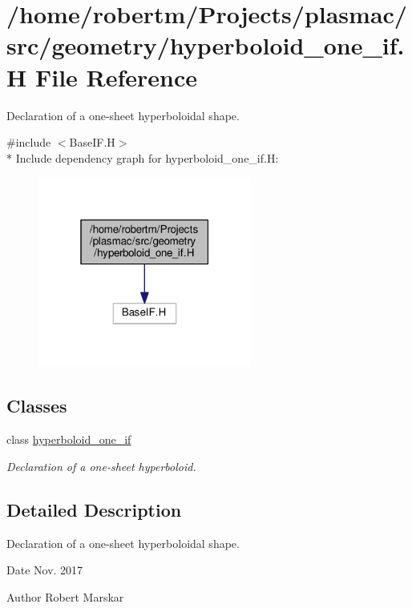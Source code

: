 \hypertarget{hyperboloid__one__if_8H}{}\section{/home/robertm/\+Projects/plasmac/src/geometry/hyperboloid\+\_\+one\+\_\+if.H File Reference}
\label{hyperboloid__one__if_8H}


Declaration of a one-\/sheet hyperboloidal shape.  


{\ttfamily \#include $<$Base\+I\+F.\+H$>$}\\*
Include dependency graph for hyperboloid\+\_\+one\+\_\+if.\+H\+:\nopagebreak
\begin{figure}[H]
\begin{center}
\leavevmode
\includegraphics[width=199pt]{hyperboloid__one__if_8H__incl}
\end{center}
\end{figure}
\subsection*{Classes}
\begin{DoxyCompactItemize}
\item 
class \hyperlink{classhyperboloid__one__if}{hyperboloid\+\_\+one\+\_\+if}
\begin{DoxyCompactList}\small\item\em Declaration of a one-\/sheet hyperboloid. \end{DoxyCompactList}\end{DoxyCompactItemize}


\subsection{Detailed Description}
Declaration of a one-\/sheet hyperboloidal shape. 

\begin{DoxyDate}{Date}
Nov. 2017 
\end{DoxyDate}
\begin{DoxyAuthor}{Author}
Robert Marskar 
\end{DoxyAuthor}
